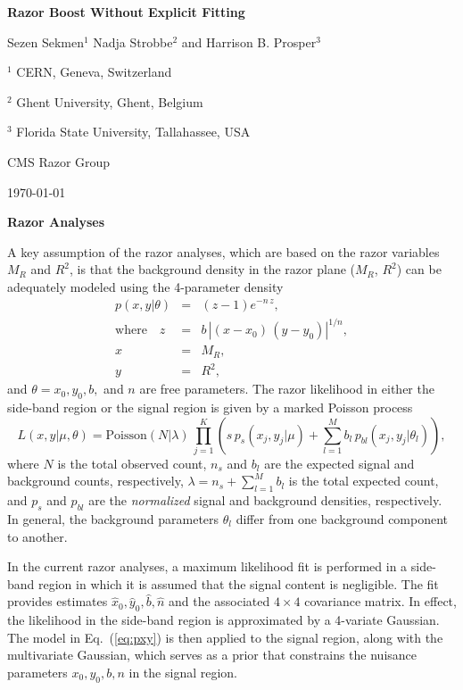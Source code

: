 \documentclass[aps,prd,preprint]{revtex4}
\begin{document}
\centerline{\bf \large Razor Boost Without Explicit Fitting}

\centerline{Sezen Sekmen$^1$ Nadja Strobbe$^2$ and Harrison B. Prosper$^3$}

\centerline{$^1$ CERN, Geneva, Switzerland}
\centerline{$^2$ Ghent University, Ghent, Belgium}
\centerline{$^3$ Florida State University, Tallahassee, USA}

\centerline{CMS Razor Group}
\centerline{\today}

\bigskip

\bigskip

\noindent
{\bf \large Razor Analyses}

A key assumption of the razor analyses, which are based on the razor variables $M_R$ and $R^2$, is that the background density in the razor plane ($M_R$, $R^2$) can be adequately modeled using the
4-parameter density
\begin{eqnarray}
p(x, y|\theta) & = & (z - 1) e^{-n \, z}, \nonumber \\
	\text{where}\quad z 	& = & b \, |(x - x_0) \, (y - y_0)|^{1/n}, \nonumber \\
				x	& = & M_R, \nonumber \\
				y	& = & R^2, 
				\label{eq:pxy}
\end{eqnarray}
and $\theta = x_0, y_0, b, $ and $n$ are free parameters. The razor likelihood in
either the side-band region or the signal region is given by a
marked Poisson process
\begin{equation}
	L(x, y|\mu, \theta) = \text{Poisson}(N|\lambda) \, \prod_{j=1}^K \left( s \, p_s(x_j, y_j|\mu) + \sum_{l=1}^M b_l \, p_{bl}(x_j, y_j|\theta_l) \right),
\end{equation}
where $N$ is the total observed count, $n_s$ and $b_l$ are the expected signal and background counts, respectively, $\lambda = n_s + \sum_{l=1}^M b_l$ is the total expected count, and
$p_s$ and $p_{bl}$ are the \emph{normalized} signal and background
densities, respectively. In general, the background parameters $\theta_l$ differ from one background component to another.

In the current razor analyses, a maximum likelihood fit is performed in a side-band region
in which it is assumed that the signal content is negligible. The fit provides estimates 
$\hat{x}_0, \hat{y}_0, \hat{b}, \hat{n}$ and the associated $4 \times 4$ covariance matrix. 
In effect, the likelihood in the side-band region is approximated by a 4-variate Gaussian.
The
model in Eq.~(\ref{eq:pxy}) is then applied to the signal region, along with the
multivariate Gaussian, which serves as a prior that constrains the nuisance
parameters $x_0, y_0, b, n$ in the signal region. 
\end{document}
